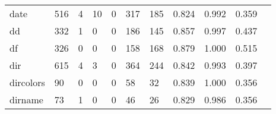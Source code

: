 \begin{longtable}{lp{1.2cm}p{1.2cm}p{1.2cm}p{1.2cm}p{1.2cm}p{1.2cm}p{1.2cm}p{1.2cm}p{1.2cm}p{1.2cm}}
date      &                                   516 &                                                  4 &                                                 10 &                                                  0 &                                                317 &                                                185 &                                              0.824 &                                              0.992 &                                              0.359 \\
dd        &                                   332 &                                                  1 &                                                  0 &                                                  0 &                                                186 &                                                145 &                                              0.857 &                                              0.997 &                                              0.437 \\
df        &                                   326 &                                                  0 &                                                  0 &                                                  0 &                                                158 &                                                168 &                                              0.879 &                                              1.000 &                                              0.515 \\
dir       &                                   615 &                                                  4 &                                                  3 &                                                  0 &                                                364 &                                                244 &                                              0.842 &                                              0.993 &                                              0.397 \\
dircolors &                                    90 &                                                  0 &                                                  0 &                                                  0 &                                                 58 &                                                 32 &                                              0.839 &                                              1.000 &                                              0.356 \\
dirname   &                                    73 &                                                  1 &                                                  0 &                                                  0 &                                                 46 &                                                 26 &                                              0.829 &                                              0.986 &                                              0.356 \\

\end{longtable}
